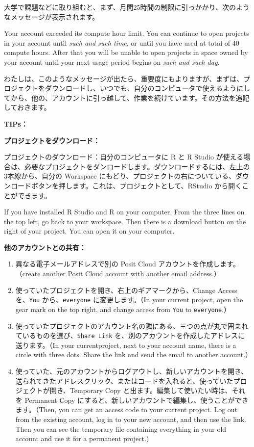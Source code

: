 \documentclass[
]{bxjsbook}
\providecommand{\tightlist}{%
  \setlength{\itemsep}{0pt}\setlength{\parskip}{0pt}}
\theoremstyle{definition}
\theoremstyle{definition}
\theoremstyle{definition}
\theoremstyle{definition}
\theoremstyle{remark}
\begin{document}
大学で課題などに取り組むと、まず、月間25時間の制限に引っかかり、次のようなメッセージが表示されます。

Your account exceeded its compute hour limit. You can continue to open projects in your account until \emph{such and such time}, or until you have used at total of 40 compute hours. After that you will be unable to open projects in space owned by your account until your next usage period begins on \emph{such and such day}.

わたしは、このようなメッセージが出たら、重要度にもよりますが、まずは、プロジェクトをダウンロードし、いつでも、自分のコンピュータで使えるようにしてから、他の、アカウントに引っ越して、作業を続けています。その方法を追記しておきます。

\textbf{TIPs：}

\textbf{プロジェクトをダウンロード：}

プロジェクトのダウンロード：自分のコンピュータに R と R Studio が使える場合は、必要なプロジェクトをダンロードします。ダウンロードするには、左上の3本線から、自分の Workspace にもどり、プロジェクトの右についている、ダウンロードボタンを押します。これは、プロジェクトとして、RStudio から開くことができます。

If you have installed R Studio and R on your computer, From the three lines on the top left, go back to your workspace.
Then there is a download button on the right of your project. You can open it on your computer.

\textbf{他のアカウントとの共有：}

\begin{enumerate}
\def\labelenumi{\arabic{enumi}.}
\tightlist
\item
  異なる電子メールアドレスで別の Posit Cloud アカウントを作成します。（create another Posit Cloud account with another email address.）
\item
  使っていたプロジェクトを開き、右上のギアマークから、Change Access を、\texttt{You} から、\texttt{everyone} に変更します。（In your current project, open the gear mark on the top right, and change access from \texttt{You} to \texttt{everyone}.）
\item
  使っていたプロジェクトのアカウント名の隣にある、三つの点が丸で囲まれているものを選び、\texttt{Share\ Link} を、別のアカウントを作成したアドレスに送ります。（In your currentproject, next to your account name, there is a circle with three dots. Share the link and send the email to another account.）
\item
  使っていた、元のアカウントからログアウトし、新しいアカウントを開き、送られてきたアドレスクリック、またはコードを入れると、使っていたプロジェクトが開き、Temporary Copy と出ます。編集して使いたい時は、それを Permanent Copy にすると、新しいアカウントで編集し、使うことができます。（Then, you can get an access code to your current project. Log out from the existing account, log in to your new account, and then use the link.
  Then you can see the temporary file containing everything in your old account and use it for a permanent project.)
\end{enumerate}
\end{document}
